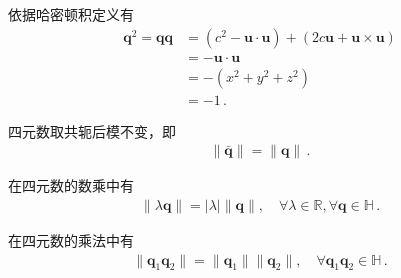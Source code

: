 \begin{prove}
    依据哈密顿积定义有
    \begin{align}
        {\bm q}^2={\bm q}{\bm q} & =(c^2-{\bm u}\cdot{\bm u})+(2c{\bm u}+{\bm u}\times{\bm u})\nonumber \\
                                 & =-{\bm u}\cdot{\bm u}\nonumber                                       \\
                                 & =-(x^2+y^2+z^2)\nonumber                                             \\
                                 & =-1\, .
    \end{align}
\end{prove}
\begin{proposition}
    四元数取共轭后模不变，即
    \begin{align}
        \|\bar{\bm q}\|=\|{\bm q}\|\, .
    \end{align}
\end{proposition}
\begin{proposition}
    在四元数的数乘中有
    \begin{align}
        \|\lambda{\bm q}\|=|\lambda|\|{\bm q}\|, \quad \forall \lambda\in\mathbb{R}, \forall {\bm q}\in\mathbb{H}\, .
    \end{align}
\end{proposition}
\begin{proposition}
    在四元数的乘法中有
    \begin{align}
        \|{\bm q}_1{\bm q}_2\|=\|{\bm q}_1\|\|{\bm q}_2\|,\quad \forall {\bm q}_1{\bm q}_2\in\mathbb{H}\, .
    \end{align}
\end{proposition}
